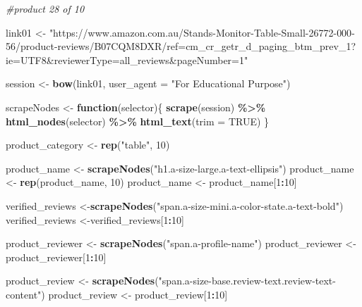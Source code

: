 \documentclass[
]{article}
\newenvironment{Shaded}{\begin{snugshade}}{\end{snugshade}}
\newcommand{\AttributeTok}[1]{\textcolor[rgb]{0.13,0.29,0.53}{#1}}
\newcommand{\CommentTok}[1]{\textcolor[rgb]{0.56,0.35,0.01}{\textit{#1}}}
\newcommand{\ConstantTok}[1]{\textcolor[rgb]{0.56,0.35,0.01}{#1}}
\newcommand{\ControlFlowTok}[1]{\textcolor[rgb]{0.13,0.29,0.53}{\textbf{#1}}}
\newcommand{\DecValTok}[1]{\textcolor[rgb]{0.00,0.00,0.81}{#1}}
\newcommand{\FunctionTok}[1]{\textcolor[rgb]{0.13,0.29,0.53}{\textbf{#1}}}
\newcommand{\NormalTok}[1]{#1}
\newcommand{\OtherTok}[1]{\textcolor[rgb]{0.56,0.35,0.01}{#1}}
\newcommand{\SpecialCharTok}[1]{\textcolor[rgb]{0.81,0.36,0.00}{\textbf{#1}}}
\newcommand{\StringTok}[1]{\textcolor[rgb]{0.31,0.60,0.02}{#1}}
\begin{document}
\begin{Shaded}
\begin{Highlighting}[]
\CommentTok{\#product 28 of 10}

\NormalTok{link01 }\OtherTok{\textless{}{-}} \StringTok{"https://www.amazon.com.au/Stands{-}Monitor{-}Table{-}Small{-}26772{-}000{-}56/product{-}reviews/B07CQM8DXR/ref=cm\_cr\_getr\_d\_paging\_btm\_prev\_1?ie=UTF8\&reviewerType=all\_reviews\&pageNumber=1"}


\NormalTok{  session }\OtherTok{\textless{}{-}} \FunctionTok{bow}\NormalTok{(link01,}
               \AttributeTok{user\_agent =} \StringTok{"For Educational Purpose"}\NormalTok{)}

\NormalTok{  scrapeNodes }\OtherTok{\textless{}{-}} \ControlFlowTok{function}\NormalTok{(selector)\{}
    \FunctionTok{scrape}\NormalTok{(session) }\SpecialCharTok{\%\textgreater{}\%}
      \FunctionTok{html\_nodes}\NormalTok{(selector) }\SpecialCharTok{\%\textgreater{}\%}
      \FunctionTok{html\_text}\NormalTok{(}\AttributeTok{trim =} \ConstantTok{TRUE}\NormalTok{)}
\NormalTok{  \}}

\NormalTok{  product\_category }\OtherTok{\textless{}{-}} \FunctionTok{rep}\NormalTok{(}\StringTok{"table"}\NormalTok{, }\DecValTok{10}\NormalTok{)}

\NormalTok{  product\_name }\OtherTok{\textless{}{-}} \FunctionTok{scrapeNodes}\NormalTok{(}\StringTok{"h1.a{-}size{-}large.a{-}text{-}ellipsis"}\NormalTok{)}
\NormalTok{  product\_name }\OtherTok{\textless{}{-}} \FunctionTok{rep}\NormalTok{(product\_name, }\DecValTok{10}\NormalTok{)}
\NormalTok{  product\_name }\OtherTok{\textless{}{-}}\NormalTok{ product\_name[}\DecValTok{1}\SpecialCharTok{:}\DecValTok{10}\NormalTok{]}
  
\NormalTok{  verified\_reviews }\OtherTok{\textless{}{-}}\FunctionTok{scrapeNodes}\NormalTok{(}\StringTok{"span.a{-}size{-}mini.a{-}color{-}state.a{-}text{-}bold"}\NormalTok{)}
\NormalTok{  verified\_reviews }\OtherTok{\textless{}{-}}\NormalTok{verified\_reviews[}\DecValTok{1}\SpecialCharTok{:}\DecValTok{10}\NormalTok{]}
  
\NormalTok{  product\_reviewer }\OtherTok{\textless{}{-}} \FunctionTok{scrapeNodes}\NormalTok{(}\StringTok{"span.a{-}profile{-}name"}\NormalTok{)}
\NormalTok{  product\_reviewer }\OtherTok{\textless{}{-}}\NormalTok{ product\_reviewer[}\DecValTok{1}\SpecialCharTok{:}\DecValTok{10}\NormalTok{]}
  
\NormalTok{  product\_review }\OtherTok{\textless{}{-}} \FunctionTok{scrapeNodes}\NormalTok{(}\StringTok{"span.a{-}size{-}base.review{-}text.review{-}text{-}content"}\NormalTok{)}
\NormalTok{  product\_review }\OtherTok{\textless{}{-}}\NormalTok{ product\_review[}\DecValTok{1}\SpecialCharTok{:}\DecValTok{10}\NormalTok{]}
  

\end{Highlighting}
\end{Shaded}
\end{document}

